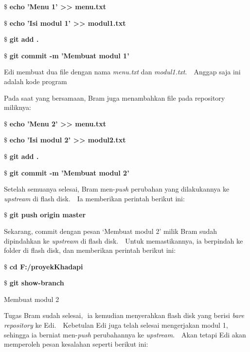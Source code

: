 \noindent 
 $  \$  $ \textbf{echo 'Menu 1' >> menu.txt} \par
\noindent 
 $  \$  $ \textbf{echo 'Isi modul 1' >> modul1.txt} \par
\noindent 
 $  \$  $ \textbf{git add .} \par
\noindent 
 $  \$  $ \textbf{git commit -m 'Membuat modul 1'} \par
\noindent 
Edi membuat dua file dengan nama \textit{menu.txt} dan \textit{modul1.txt}. $  $ $  $ Anggap saja ini adalah kode program  \par
\noindent 
Pada saat yang bersamaan, Bram juga menambahkan file pada repository miliknya: \par
\vspace{12pt}
\noindent 
 $  \$  $ \textbf{echo 'Menu 2' >> menu.txt} \par
\noindent 
 $  \$  $ \textbf{echo 'Isi modul 2' >> modul2.txt} \par
\noindent 
 $  \$  $ \textbf{git add .} \par
\noindent 
 $  \$  $ \textbf{git commit -m 'Membuat modul 2'} \par
\noindent 
\vspace{12pt}
\noindent 
Setelah semuanya selesai, Bram men-\textit{push} perubahan yang dilakukannya ke \textit{upstream} di flash disk. $  $ $  $ Ia memberikan perintah berikut ini: \par
\vspace{12pt}
\noindent 
 $  \$  $ \textbf{git push origin master} \par
\noindent 
\vspace{12pt}
\noindent 
Sekarang, commit dengan pesan ‘Membuat modul 2’ milik Bram sudah dipindahkan ke \textit{upstream }di flash disk. $  $ $  $ Untuk memastikannya, ia berpindah ke folder di flash disk, dan memberikan perintah berikut ini: \par
\vspace{12pt}
\noindent 
 $  \$  $ \textbf{cd F:/proyek}\textbf{Khadapi} \par
\noindent 
 $  \$  $ \textbf{git show-branch} \par
\noindent 
[master] Membuat modul 2 \par
\noindent 
\vspace{12pt}
\noindent 
Tugas Bram sudah selesai, $  $ ia kemudian menyerahkan flash disk yang berisi \textit{bare repository} ke Edi. $  $ $  $ Kebetulan Edi juga telah selesai mengerjakan modul 1, sehingga ia berniat men-\textit{push} perubahannya ke \textit{upstream}. $  $ $  $ Akan tetapi Edi akan memperoleh pesan kesalahan seperti berikut ini: \par
